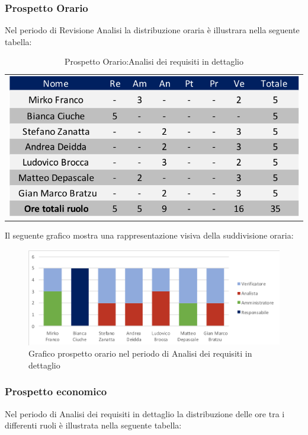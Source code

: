 \subsubsection{Prospetto Orario}
Nel periodo di Revisione Analisi la distribuzione oraria è illustrara nella seguente tabella:
\begin{table}[!ht]
		\begin{center}
	\begin{tabular}{c}
	\includegraphics{images/tabellaProspettoOrarioDett.png}
\end{tabular}
	\caption{Prospetto Orario:Analisi dei requisiti in dettaglio}
	\end{center}
\end{table}

Il seguente grafico mostra una rappresentazione visiva della suddivisione oraria:
\begin{figure}[!ht]
		\begin{center}
	\includegraphics{images/grafoProspettoOrarioDett.png}
	\caption{Grafico prospetto orario nel periodo di Analisi dei requisiti in dettaglio}
	\end{center}
\end{figure}

\newpage
\subsubsection{Prospetto economico}
Nel periodo di Analisi dei requisiti in dettaglio la distribuzione delle ore tra i differenti ruoli è illustrata nella seguente tabella:

